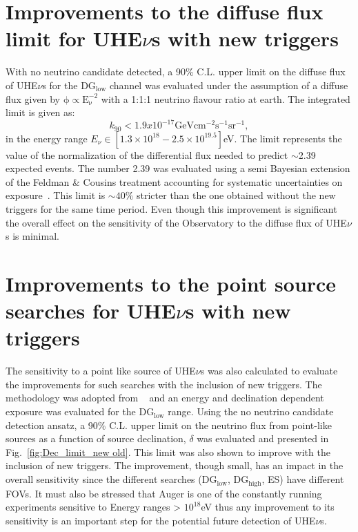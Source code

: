 \section*{Improvements to the diffuse flux limit for UHE$\nu$s with new triggers}
With no neutrino candidate detected, a 90\% C.L. upper limit on the diffuse flux of UHE$\nu$s for the DG$\mathrm{_{low}}$ channel was evaluated under the assumption of a diffuse flux given by $\mathrm{\phi \propto E_{\nu}^{-2}}$ with a 1:1:1 neutrino flavour ratio at earth. The integrated limit is given as:
\begin{equation}
    k_{90} < 1.9 x 10^{-17} \mathrm{GeV cm^{-2} s^{-1} sr^{-1}},
\end{equation}
in the energy range $E_{\nu} \in [1.3 \times 10^{18} - 2.5 \times 10^{19.5}]$eV. The limit represents the value of the normalization of the differential flux needed to predict $\sim$2.39 expected events. The number 2.39 was evaluated using a semi Bayesian extension of the Feldman \& Cousins treatment accounting for systematic uncertainties on exposure~\cite{Conrad:2002kn}. This limit is $\sim 40\%$ stricter than the one obtained without the new triggers for the same time period. Even though this improvement is significant the overall effect on the sensitivity of the Observatory to the diffuse flux of UHE$\nu$s is minimal. 
\section*{Improvements to the point source searches for UHE$\nu$s with new triggers}
The sensitivity to a point like source of UHE$\nu$s was also calculated to evaluate the improvements for such searches with the inclusion of new triggers. The methodology was adopted from ~\cite{Aab_2019_point} and an energy and declination dependent exposure was evaluated for the DG$\mathrm{_{low}}$ range. Using the no neutrino candidate detection ansatz, a 90\% C.L. upper limit on the neutrino flux from point-like sources as a function of source declination, $\delta$ was evaluated and presented in Fig.~\ref{fig:Dec_limit_new old}. This limit was also shown to improve with the inclusion of new triggers. The improvement, though small, has an impact in the overall sensitivity since the different searches (DG$\mathrm{_{low}}$, DG$\mathrm{_{high}}$, ES) have different FOVs. It must also be stressed that Auger is one of the constantly running experiments sensitive to Energy ranges > $10^{18}$eV thus any improvement to its sensitivity is an important step for the potential future detection of UHE$\nu$s.



